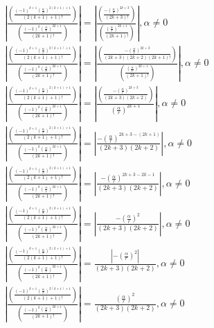 \documentclass[a4paper,12pt]{report}
\begin{document}
\begin{landscape}
{\begin{gather}
\left|\frac{\left(\frac{(-1)^{k+1} \left(\frac{\alpha}{r}\right)^{2(k+1)+1}}{(2(k+1)+1)!}\right)}{\left(\frac{(-1)^k \left(\frac{\alpha}{r}\right)^{2k+1}}{(2k+1)!}\right)}\right| = \left|\frac{\left(\frac{-\left(\frac{\alpha}{r}\right)^{2k+3}}{(2k+3)!}\right)}{\left(\frac{\left(\frac{\alpha}{r}\right)^{2k+1}}{(2k+1)!}\right)}\right|, \alpha \neq 0 \\
\left|\frac{\left(\frac{(-1)^{k+1} \left(\frac{\alpha}{r}\right)^{2(k+1)+1}}{(2(k+1)+1)!}\right)}{\left(\frac{(-1)^k \left(\frac{\alpha}{r}\right)^{2k+1}}{(2k+1)!}\right)}\right| = \left|\frac{\left(\frac{-\left(\frac{\alpha}{r}\right)^{2k+3}}{(2k+3)(2k+2)(2k+1)!}\right)}{\left(\frac{\left(\frac{\alpha}{r}\right)^{2k+1}}{(2k+1)!}\right)}\right|, \alpha \neq 0 \\
\left|\frac{\left(\frac{(-1)^{k+1} \left(\frac{\alpha}{r}\right)^{2(k+1)+1}}{(2(k+1)+1)!}\right)}{\left(\frac{(-1)^k \left(\frac{\alpha}{r}\right)^{2k+1}}{(2k+1)!}\right)}\right| = \left|\frac{\left(\frac{-\left(\frac{\alpha}{r}\right)^{2k+3}}{(2k+3)(2k+2)}\right)}{\left(\frac{\alpha}{r}\right)^{2k+1}}\right|, \alpha \neq 0 \\
\left|\frac{\left(\frac{(-1)^{k+1} \left(\frac{\alpha}{r}\right)^{2(k+1)+1}}{(2(k+1)+1)!}\right)}{\left(\frac{(-1)^k \left(\frac{\alpha}{r}\right)^{2k+1}}{(2k+1)!}\right)}\right| = \left|\frac{-\left(\frac{\alpha}{r}\right)^{2k+3-(2k+1)}}{(2k+3)(2k+2)}\right|, \alpha \neq 0 \\
\left|\frac{\left(\frac{(-1)^{k+1} \left(\frac{\alpha}{r}\right)^{2(k+1)+1}}{(2(k+1)+1)!}\right)}{\left(\frac{(-1)^k \left(\frac{\alpha}{r}\right)^{2k+1}}{(2k+1)!}\right)}\right| = \left|\frac{-\left(\frac{\alpha}{r}\right)^{2k+3-2k-1}}{(2k+3)(2k+2)}\right|, \alpha \neq 0 \\
\left|\frac{\left(\frac{(-1)^{k+1} \left(\frac{\alpha}{r}\right)^{2(k+1)+1}}{(2(k+1)+1)!}\right)}{\left(\frac{(-1)^k \left(\frac{\alpha}{r}\right)^{2k+1}}{(2k+1)!}\right)}\right| = \left|\frac{-\left(\frac{\alpha}{r}\right)^2}{(2k+3)(2k+2)}\right|, \alpha \neq 0 \\
\left|\frac{\left(\frac{(-1)^{k+1} \left(\frac{\alpha}{r}\right)^{2(k+1)+1}}{(2(k+1)+1)!}\right)}{\left(\frac{(-1)^k \left(\frac{\alpha}{r}\right)^{2k+1}}{(2k+1)!}\right)}\right| = \frac{\left|-\left(\frac{\alpha}{r}\right)^2\right|}{(2k+3)(2k+2)}, \alpha \neq 0 \\
\left|\frac{\left(\frac{(-1)^{k+1} \left(\frac{\alpha}{r}\right)^{2(k+1)+1}}{(2(k+1)+1)!}\right)}{\left(\frac{(-1)^k \left(\frac{\alpha}{r}\right)^{2k+1}}{(2k+1)!}\right)}\right| = \frac{\left(\frac{\alpha}{r}\right)^2}{(2k+3)(2k+2)}, \alpha \neq 0 \\

\end{gather}}
\end{landscape}
\end{document}
